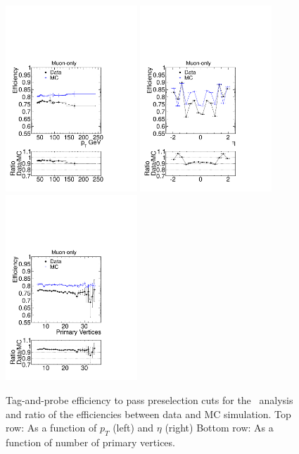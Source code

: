 \begin{figure}
 \begin{center}
  \includegraphics[clip=false, trim=0.0cm 0cm 0cm 0cm, width=0.44\textwidth]{figures/muonly/pteff_Comp}
  \includegraphics[clip=false, trim=0.0cm 0cm 0cm 0cm, width=0.44\textwidth]{figures/muonly/etaeff_Comp}
  \includegraphics[clip=false, trim=0.0cm 0cm 0cm 0cm, width=0.44\textwidth]{figures/muonly/PVeff_Comp}
 \end{center}
 \caption[Efficiency to pass preselection cuts for the \muononly\ analysis as a function of \pt, $\eta$, and number of primary vertices]
{Tag-and-probe efficiency to pass preselection cuts for the \muononly\ analysis and ratio of the efficiencies between data and MC simulation.
Top row: As a function of $p_T$ (left) and $\eta$ (right)
Bottom row: As a function of number of primary vertices.}
   \label{fig:MuOnlyTagProbeEff}
\end{figure}